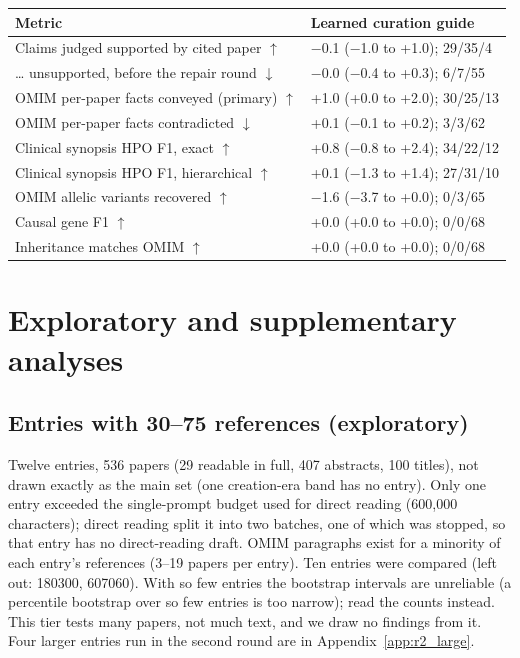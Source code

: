 \documentclass{article} %
\begin{document}
\begin{table}[!htb]
\begin{tabularx}{\linewidth}{>{\raggedright\arraybackslash}p{5.6cm}>{\centering\arraybackslash}X}
\toprule
Metric & Learned curation guide \\
\midrule
Claims judged supported by cited paper $\uparrow$ & $-$0.1 ($-$1.0 to +1.0); 29/35/4 \\
\ldots{} unsupported, before the repair round $\downarrow$ & $-$0.0 ($-$0.4 to +0.3); 6/7/55 \\
OMIM per-paper facts conveyed (primary) $\uparrow$ & +1.0 (+0.0 to +2.0); 30/25/13 \\
OMIM per-paper facts contradicted $\downarrow$ & +0.1 ($-$0.1 to +0.2); 3/3/62 \\
Clinical synopsis HPO F1, exact $\uparrow$ & +0.8 ($-$0.8 to +2.4); 34/22/12 \\
Clinical synopsis HPO F1, hierarchical $\uparrow$ & +0.1 ($-$1.3 to +1.4); 27/31/10 \\
OMIM allelic variants recovered $\uparrow$ & $-$1.6 ($-$3.7 to +0.0); 0/3/65 \\
Causal gene F1 $\uparrow$ & +0.0 (+0.0 to +0.0); 0/0/68 \\
Inheritance matches OMIM $\uparrow$ & +0.0 (+0.0 to +0.0); 0/0/68 \\
\bottomrule
\end{tabularx}
\end{table}

\FloatBarrier
\section{Exploratory and supplementary analyses}
\FloatBarrier
\subsection{Entries with 30--75 references (exploratory)}
\label{app:large}
Twelve entries, 536 papers (29 readable in full, 407 abstracts, 100 titles), not drawn exactly as the main set (one creation-era band has no entry). Only one entry exceeded the single-prompt budget used for direct reading (600,000 characters); direct reading split it into two batches, one of which was stopped, so that entry has no direct-reading draft. OMIM paragraphs exist for a minority of each entry's references (3--19 papers per entry). Ten entries were compared (left out: 180300, 607060). With so few entries the bootstrap intervals are unreliable (a percentile bootstrap over so few entries is too narrow); read the counts instead. This tier tests many papers, not much text, and we draw no findings from it. Four larger entries run in the second round are in Appendix~\ref{app:r2_large}.
\end{document}
